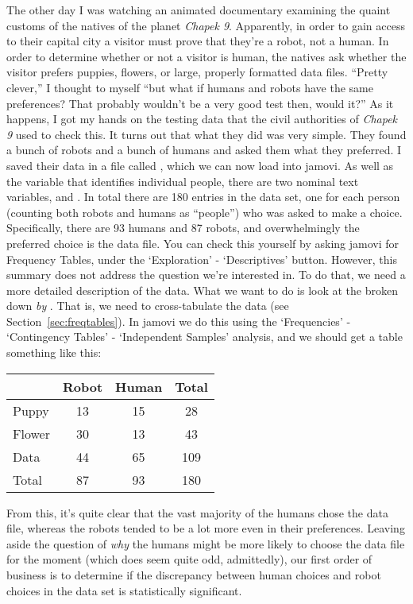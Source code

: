 \noindent
The other day I was watching an animated documentary examining the quaint customs of the natives of the planet {\it Chapek 9}. Apparently, in order to gain access to their capital city a visitor must prove that they're a robot, not a human. In order to determine whether or not a visitor is human, the natives ask whether the visitor prefers puppies, flowers, or large, properly formatted data files. ``Pretty clever,'' I thought to myself ``but what if humans and robots have the same preferences? That probably wouldn't be a very good test then, would it?'' As it happens, I got my hands on the testing data that the civil authorities of {\it Chapek 9} used to check this. It turns out that what they did was very simple. They found a bunch of robots and a bunch of humans and asked them what they preferred. I saved their data in a file called , which we can now load into jamovi. As well as the  variable that identifies individual people, there are two nominal text variables,  and . In total there are 180 entries in the data set, one for each person (counting both robots and humans as ``people'') who was asked to make a choice. Specifically, there are 93 humans and 87 robots, and overwhelmingly the preferred choice is the data file. You can check this yourself by asking jamovi for Frequency Tables, under the `Exploration' - `Descriptives' button. However, this summary does not address the question we're interested in. To do that, we need a more detailed description of the data. What we want to do is look at the  broken down {\it by} . That is, we need to cross-tabulate the data (see Section~\ref{sec:freqtables}). In jamovi we do this using the `Frequencies' - `Contingency Tables' - `Independent Samples' analysis, and we should get a table something like this:
\begin{center}
\begin{tabular}{l|cc|c}
          & Robot & Human & Total \\ \hline
Puppy     & 13 & 15 & 28 \\ 
Flower    & 30 & 13 & 43 \\
Data      & 44 & 65 & 109 \\ \hline
Total     & 87 & 93 & 180
\end{tabular}
\end{center}

From this, it's quite clear that the vast majority of the humans chose the data file, whereas the robots tended to be a lot  more even in their preferences. Leaving aside the question of {\it why} the humans might be more likely to choose the data file for the moment (which does seem quite odd, admittedly), our first order of business is to determine if the discrepancy between human choices and robot choices in the data set is statistically significant.

